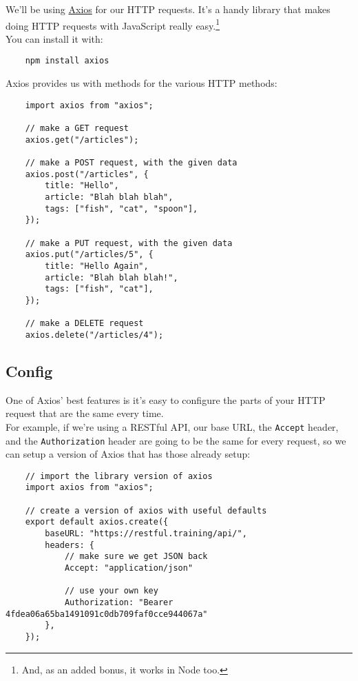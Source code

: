 We'll be using \href{https://github.com/mzabriskie/axios}{Axios} for our HTTP requests. It's a handy library that makes doing HTTP requests with JavaScript really easy.\footnote{And, as an added bonus, it works in Node too.}
\\

You can install it with:

\begin{verbatim}
    npm install axios
\end{verbatim}

Axios provides us with methods for the various HTTP methods:

\begin{verbatim}
    import axios from "axios";

    // make a GET request
    axios.get("/articles");

    // make a POST request, with the given data
    axios.post("/articles", {
        title: "Hello",
        article: "Blah blah blah",
        tags: ["fish", "cat", "spoon"],
    });

    // make a PUT request, with the given data
    axios.put("/articles/5", {
        title: "Hello Again",
        article: "Blah blah blah!",
        tags: ["fish", "cat"],
    });

    // make a DELETE request
    axios.delete("/articles/4");
\end{verbatim}


\subsection{Config}

One of Axios' best features is it's easy to configure the parts of your HTTP request that are the same every time.
\\

For example, if we're using a RESTful API, our base URL, the \texttt{Accept} header, and the \texttt{Authorization} header are going to be the same for every request, so we can setup a version of Axios that has those already setup:

\begin{verbatim}
    // import the library version of axios
    import axios from "axios";

    // create a version of axios with useful defaults
    export default axios.create({
        baseURL: "https://restful.training/api/",
        headers: {
            // make sure we get JSON back
            Accept: "application/json"

            // use your own key
            Authorization: "Bearer 4fdea06a65ba1491091c0db709faf0cce944067a"
        },
    });
\end{verbatim}


